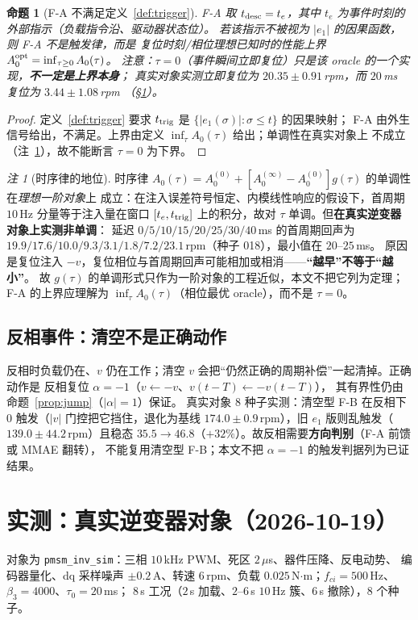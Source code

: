 \documentclass[11pt,a4paper]{article}
\newtheorem{proposition}{命题}
\theoremstyle{remark}
\newtheorem{remark}{注}
\begin{document}
\begin{proposition}[F-A 不满足定义~\ref{def:trigger}]\label{prop:fa}
F-A 取 $t_{\rm desc}=t_e$，其中 $t_e$ 为事件时刻的外部指示（负载指令沿、驱动器状态位）。
若该指示不被视为 $|e_1|$ 的因果函数，则 F-A 不是触发律，而是
\emph{复位时刻/相位理想已知时的性能上界}
$A_0^{\rm opt}=\inf_{\tau\ge0}A_0(\tau)$。
注意：$\tau=0$（事件瞬间立即复位）只是该 oracle 的一个实现，\textbf{不一定是上界本身}；
真实对象实测立即复位为 $20.35\pm0.91$\,rpm，而 $20$\,ms 复位为 $3.44\pm1.08$\,rpm
（\S\ref{sec:fb-dilemma}）。
\end{proposition}
\begin{proof}
定义~\ref{def:trigger} 要求 $t_{\rm trig}$ 是 $\{|e_1(\sigma)|:\sigma\le t\}$ 的因果映射；
F-A 由外生信号给出，不满足。上界由定义 $\inf_\tau A_0(\tau)$ 给出；单调性在真实对象上
不成立（注~\ref{rem:timing}），故不能断言 $\tau=0$ 为下界。
\end{proof}

\begin{remark}[时序律的地位]\label{rem:timing}
时序律 $A_0(\tau)=A_0^{(0)}+[A_0^{(\infty)}-A_0^{(0)}]g(\tau)$ 的单调性在\emph{理想一阶对象}上
成立：在注入误差符号恒定、内模线性响应的假设下，首周期 $10$\,Hz 分量等于注入量在窗口
$[t_e,t_{\rm trig}]$ 上的积分，故对 $\tau$ 单调。但\textbf{在真实逆变器对象上实测非单调}：
延迟 $0/5/10/15/20/25/30/40$\,ms 的首周期回声为
$19.9/17.6/10.0/9.3/3.1/1.8/7.2/23.1$\,rpm（种子 018），最小值在 $20$--$25$\,ms。
原因是复位注入 $-v$，复位相位与首周期回声可能相加或相消——\textbf{“越早”不等于“越小”}。
故 $g(\tau)$ 的单调形式只作为一阶对象的工程近似，本文不把它列为定理；F-A 的上界应理解为
$\inf_\tau A_0(\tau)$（相位最优 oracle），而不是 $\tau=0$。
\end{remark}

\subsection{反相事件：清空不是正确动作}\label{sec:reversal}
反相时负载仍在、$v$ 仍在工作；清空 $v$ 会把“仍然正确的周期补偿”一起清掉。正确动作是
反相复位 $\alpha=-1$（$v\leftarrow-v$、$v(t-T)\leftarrow-v(t-T)$），
其有界性仍由命题~\ref{prop:jump}（$|\alpha|=1$）保证。
真实对象 8 种子实测：清空型 F-B 在反相下 0 触发（$|v|$ 门控把它挡住，退化为基线
$174.0\pm0.9$\,rpm），旧 $e_1$ 版则乱触发（$139.0\pm44.2$\,rpm）且稳态
$35.5\to46.8$（$+32\%$）。故反相需要\textbf{方向判别}（F-A 前馈或 MMAE 翻转），
不能复用清空型 F-B；本文不把 $\alpha=-1$ 的触发判据列为已证结果。

\section{实测：真实逆变器对象（2026-10-19）}\label{sec:fb-dilemma}
对象为 \texttt{pmsm\_inv\_sim}：三相 $10$\,kHz PWM、死区 $2\,\mu$s、器件压降、反电动势、
编码器量化、dq 采样噪声 $\pm0.2$\,A、转速 $6$\,rpm、负载 $0.025$\,N$\cdot$m；$f_{ci}=500$\,Hz、$\beta_3=4000$、$\tau_0=20$\,ms；
$8$\,s 工况（$2$\,s 加载、$2$--$6$\,s $10$\,Hz 簇、$6$\,s 撤除），8 个种子。
\end{document}
